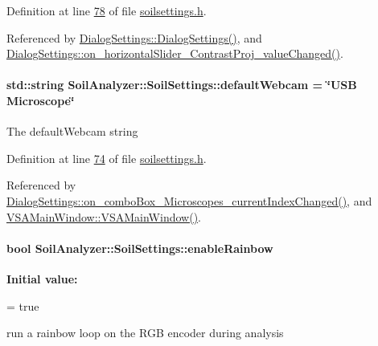 Definition at line \hyperlink{soilsettings_8h_source_l00078}{78} of file \hyperlink{soilsettings_8h_source}{soilsettings.\+h}.



Referenced by \hyperlink{dialogsettings_8cpp_source_l00005}{Dialog\+Settings\+::\+Dialog\+Settings()}, and \hyperlink{dialogsettings_8cpp_source_l00345}{Dialog\+Settings\+::on\+\_\+horizontal\+Slider\+\_\+\+Contrast\+Proj\+\_\+value\+Changed()}.

\hypertarget{class_soil_analyzer_1_1_soil_settings_a8dbe6065562599e544b55fb49564fd2d}{}
\paragraph[{default\+Webcam}]{\setlength{\rightskip}{0pt plus 5cm}std\+::string Soil\+Analyzer\+::\+Soil\+Settings\+::default\+Webcam = \char`\"{}U\+S\+B {\bf Microscope}\char`\"{}}\label{class_soil_analyzer_1_1_soil_settings_a8dbe6065562599e544b55fb49564fd2d}
The default\+Webcam string 

Definition at line \hyperlink{soilsettings_8h_source_l00074}{74} of file \hyperlink{soilsettings_8h_source}{soilsettings.\+h}.



Referenced by \hyperlink{dialogsettings_8cpp_source_l00227}{Dialog\+Settings\+::on\+\_\+combo\+Box\+\_\+\+Microscopes\+\_\+current\+Index\+Changed()}, and \hyperlink{vsamainwindow_8cpp_source_l00004}{V\+S\+A\+Main\+Window\+::\+V\+S\+A\+Main\+Window()}.

\hypertarget{class_soil_analyzer_1_1_soil_settings_a9ece0b96eb8614a497fba3a19d8b4da1}{}
\paragraph[{enable\+Rainbow}]{\setlength{\rightskip}{0pt plus 5cm}bool Soil\+Analyzer\+::\+Soil\+Settings\+::enable\+Rainbow}\label{class_soil_analyzer_1_1_soil_settings_a9ece0b96eb8614a497fba3a19d8b4da1}
{\bfseries Initial value\+:}
\begin{DoxyCode}
=
      \textcolor{keyword}{true}
\end{DoxyCode}
run a rainbow loop on the R\+G\+B encoder during analysis 

